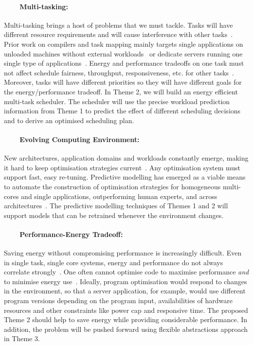 \paragraph{~~~~Multi-tasking:} Multi-tasking brings a host of problems that we must
tackle. Tasks will have different resource requirements and will cause
interference with other tasks~\cite{zheng-cgo}. Prior work on compilers and
task mapping mainly targets single applications on unloaded machines without
external workloads~\cite{5375318,Raman:2012} or dedicate servers running one single
type of applications~\cite{Agarwal:2012:RDC:2228298.2228327}.
Energy and performance tradeoffs
on one task must not affect schedule fairness, throughput, responsiveness, etc.
for other tasks~\cite{lookbackandfor}. Moreover, tasks
will have different priorities so they will have different goals for the
energy/performance tradeoff. In Theme 2, we will build an energy efficient
multi-task scheduler. The scheduler will use the precise workload prediction
information from Theme 1 to predict the effect of different scheduling decisions
and to derive an optimised scheduling plan.

\paragraph{~~~~Evolving Computing Environment:} New architectures, application
domains and workloads constantly emerge, making it hard to keep optimisation
strategies current~\cite{5375327}. Any optimisation system must support fast,
easy re-tuning. Predictive modelling
has emerged as a viable means to automate the construction of optimisation
strategies for homogeneous multi-cores and single applications, outperforming
human experts, and across architectures~\cite{Stephenson:2003,Wang-pact}. The
predictive modelling techniques of Themes 1 and 2 will support models that can be
retrained whenever the environment changes.

\paragraph{~~~~Performance-Energy Tradeoff:} Saving energy without compromising
performance is increasingly difficult. Even in single task, single
core systems, energy and performance do not always correlate strongly~\cite{tradeoff}. 
One often cannot optimise code to maximise
performance \emph{and} to minimise energy
use~\cite{lookbackandfor}. Ideally, program optimisation would respond to changes in the environment, so that a server application, for example, would use different program versions depending on the program input, availabilities of hardware resources and other constraints like power cap and responsive time. The proposed Theme 2 should help to save energy while providing considerable performance. In addition, the problem will be pushed forward using flexible abstractions approach in Theme 3.
